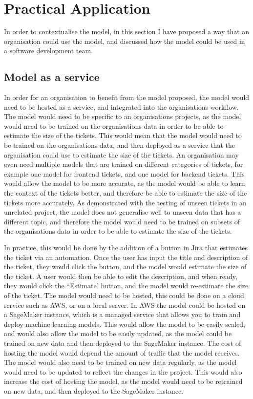 \documentclass{UoYCSproject}
\begin{document}
    \chapter{Practical Application}
    \label{ch:practical-application}

    In order to contextualise the model, in this section I have proposed a way that an organisation could use the model, and discussed how the model could be used in a software development team.
    \section[Model as a service]{Model as a service}

In order for an organisation to benefit from the model proposed, the model would need to be hosted as a service, and integrated into the organisations workflow. The model would need to be specific to an organisations projects, as the model would need to be trained on the organisations data in order to be able to estimate the size of the tickets. This would mean that the model would need to be trained on the organisations data, and then deployed as a service that the organisation could use to estimate the size of the tickets. An organisation may even need multiple models that are trained on different catagories of tickets, for example one model for frontend tickets, and one model for backend tickets. This would allow the model to be more accurate, as the model would be able to learn the context of the tickets better, and therefore be able to estimate the size of the tickets more accurately. As demonstrated with the testing of unseen tickets in an unrelated project, the model does not generalise well to unseen data that has a different topic, and therefore the model would need to be trained on subsets of the organisations data in order to be able to estimate the size of the tickets.

    In practice, this would be done by the addition of a button in Jira that estimates the ticket via an automation.
Once the user has input the title and description of the ticket, they would click the button, and the model would estimate the size of the ticket. A user would then be able to edit the description, and when ready, they would click the ``Estimate' button, and the model would re-estimate the size of the ticket.
    The model would need to be hosted, this could be done on a cloud service such as AWS, or on a local server. In AWS the model could be hosted on a SageMaker instance, which is a managed service that allows you to train and deploy machine learning models. This would allow the model to be easily scaled, and would also allow the model to be easily updated, as the model could be trained on new data and then deployed to the SageMaker instance.
The cost of hosting the model would depend the amount of traffic that the model receives.
    The model would also need to be trained on new data regularly, as the model would need to be updated to reflect the changes in the project. This would also increase the cost of hosting the model, as the model would need to be retrained on new data, and then deployed to the SageMaker instance.
\end{document}
